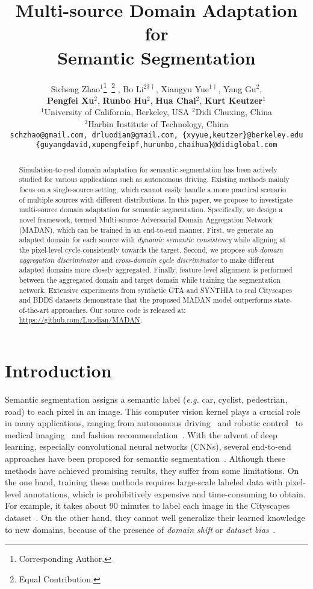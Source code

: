 \documentclass{article}
\title{Multi-source Domain Adaptation for \\Semantic Segmentation}
\author{Sicheng Zhao$^{1}$\thanks{Corresponding Author.} $\ $\thanks{Equal Contribution.} , Bo Li$^{23\dagger}$, Xiangyu Yue$^{1\dagger}$, Yang Gu$^{2}$,\\
  \textbf{Pengfei Xu}$^{2}$, \textbf{Runbo Hu}$^{2}$, \textbf{Hua Chai}$^{2}$, \textbf{Kurt Keutzer}$^{1}$\\
$^{1}$University of California, Berkeley, USA  $^{2}$Didi Chuxing, China\\
  $^{3}$Harbin Institute of Technology, China\\
  \texttt{schzhao@gmail.com, drluodian@gmail.com, \{xyyue,keutzer\}@berkeley.edu} \\
  \texttt{\{guyangdavid,xupengfeipf,hurunbo,chaihua\}@didiglobal.com}\\
}
\begin{document}
\maketitle

\begin{abstract}
Simulation-to-real domain adaptation for semantic segmentation has been actively studied for various applications such as autonomous driving. Existing methods mainly focus on a single-source setting, which cannot easily handle a more practical scenario of multiple sources with different distributions. In this paper, we propose to investigate multi-source domain adaptation for semantic segmentation. Specifically, we design a novel framework, termed Multi-source Adversarial Domain Aggregation Network (MADAN), which can be trained in an end-to-end manner. First, we generate an adapted domain for each source with \textit{dynamic semantic consistency} while aligning at the pixel-level cycle-consistently towards the target. Second, we propose \textit{sub-domain aggregation discriminator} and \textit{cross-domain cycle discriminator} to make different adapted domains more closely aggregated. Finally, feature-level alignment is performed between the aggregated domain and target domain while training the segmentation network. Extensive experiments from synthetic GTA and SYNTHIA to real Cityscapes and BDDS datasets demonstrate that the proposed MADAN model outperforms state-of-the-art approaches.  Our source code is released at: \url{https://github.com/Luodian/MADAN}.
\end{abstract}


\section{Introduction}
Semantic segmentation assigns a semantic label (\textit{e.g.} car, cyclist, pedestrian, road) to each pixel in an image. This computer vision kernel plays a crucial role in many applications, ranging from autonomous driving~\cite{geiger2012we} and robotic control~\cite{hong2018virtual} to medical imaging~\cite{cciccek20163d} and fashion recommendation~\cite{jaradat2017deep}. With the advent of deep learning, especially convolutional neural networks (CNNs), several end-to-end approaches have been proposed for semantic segmentation~\cite{long2015fully,liu2015semantic,zheng2015conditional,lin2016efficient,yu2016multi,badrinarayanan2017segnet,zhao2017pyramid,chen2017deeplab,wang2018understanding,zhou2019semantic}. Although these methods have achieved promising results, they suffer from some limitations. On the one hand, training these methods requires large-scale labeled data with pixel-level annotations, which is prohibitively expensive and time-consuming to obtain. For example, it takes about 90 minutes to label each image in the Cityscapes dataset~\cite{cordts2016cityscapes}. On the other hand, they cannot well generalize their learned knowledge to new domains, because of the presence of \emph{domain shift} or \emph{dataset bias}~\cite{torralba2011unbiased,wu2019squeezesegv2}.
\end{document}
